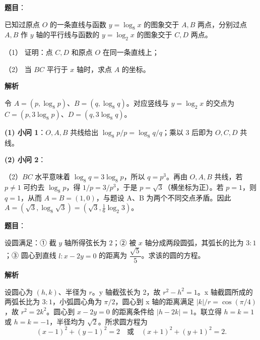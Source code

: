 \begin{answer}

\textbf{题目}：

已知过原点 $O$ 的一条直线与函数 $y=\log_8x$ 的图象交于 $A,B$ 两点，分别过点 $A,B$ 作 $y$ 轴的平行线与函数的 $y=\log_2x$ 的图象交于 $C,D$ 两点。

（1） 证明：点 $C,D$ 和原点 $O$ 在同一条直线上；

（2） 当 $BC$ 平行于 $x$ 轴时，求点 $A$ 的坐标。

\textbf{解析}

令 $A=(p,\log_8p)$、$B=(q,\log_8q)$。对应竖线与 $y=\log_2x$ 的交点为 $C=(p,3\log_8p)$、$D=(q,3\log_8q)$。

\textbf{(1) 小问 1}：$O,A,B$ 共线给出 $\log_8p/p=\log_8q/q$；乘以 3 后即为 $O,C,D$ 共线。

\textbf{(2) 小问 2}：

（2）$BC$ 水平意味着 $\log_8q=3\log_8p$，所以 $q=p^3$。再由 $O,A,B$ 共线，若 $p\ne1$ 可约去 $\log_8p$，得 $1/p=3/p^3$，于是 $p=\sqrt3$（横坐标为正）。若 $p=1$，则 $q=1$，从而 $A=B=(1,0)$，与题设 A、B 为两个不同交点矛盾。因此 $A=(\sqrt3,\log_8\sqrt3)=(\sqrt3,\frac16\log_2 3)$。



\end{answer}
\begin{answer}

\textbf{题目}：

设圆满足：① 截 $y$ 轴所得弦长为 $2$；② 被 $x$ 轴分成两段圆弧，其弧长的比为 $3:1$；③ 圆心到直线 $l:x-2y=0$ 的距离为 $\dfrac{\sqrt5}{5}$。求该的圆的方程。

\textbf{解析}

设圆心为 $(h,k)$、半径为 $r$。y 轴截弦长为 2，故 $r^2-h^2=1$。x 轴截圆所成的两弧长比为 $3:1$，小弧圆心角为 $\pi/2$，圆心到 x 轴的距离满足 $|k|/r=\cos(\pi/4)$，故 $r^2=2k^2$。圆心到 $x-2y=0$ 的距离条件给 $|h-2k|=1$。联立得 $h=k=1$ 或 $h=k=-1$，半径均为 $\sqrt2$。所求圆方程为
\nopagebreak[4]
\[
(x-1)^2+(y-1)^2=2\quad\text{或}\quad(x+1)^2+(y+1)^2=2.
\]


\end{answer}
